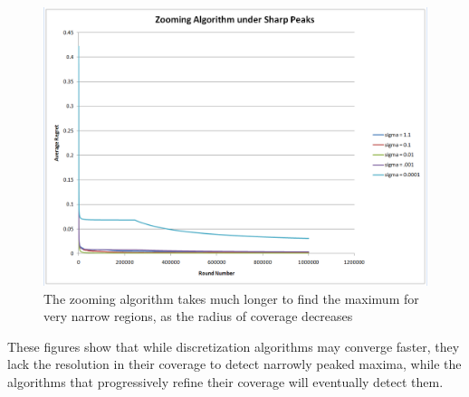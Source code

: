 \begin{figure}[!ht]
  \begin{center}
    \includegraphics[width=5 in]{figures/ZoomingBump.png}
     \caption{The zooming algorithm takes much longer to find the maximum for very narrow regions, as the radius of coverage decreases }
     \label{fig:zoomradius}
  \end{center}
\end{figure}



These figures show that while discretization algorithms may converge faster, they lack
the resolution in their coverage to detect narrowly peaked maxima, while the algorithms
that progressively refine their coverage will eventually detect them.
